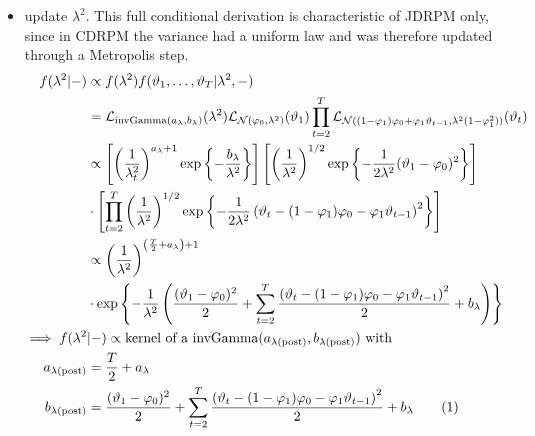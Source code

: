 \documentclass[12pt,	%
	a4paper,		%
	twoside,		%
	openright,		%
	titlepage,%
	]{book}
\theoremstyle{definition}
\begin{document}
\begin{itemize}
\item update $\lambda^2$. This full conditional derivation is characteristic of JDRPM only, since in CDRPM the variance had a uniform law and was therefore updated through a Metropolis step.
\begin{align*}
    f(\lambda^2|-) & \propto  f(\lambda^2) f(\theta_1,\ldots,\theta_T|\lambda^2,-)\\
    & = \law_{\invgamma(a_\lambda,b_\lambda)}(\lambda^2)\law_{\N(\phi_0,\lambda^2)}(\theta_1)\prod_{t=2}^{T} \law_{\N((1-\phi_1)\phi_0 +\phi_1\theta_{t-1},\lambda^2(1-\phi_1^2))}(\theta_t)\\
    &\propto \left[ \left( \frac{1}{\lambda_t^2}\right)^{a_\lambda+1} \expp{-\frac{b_\lambda}{\lambda^2}}\right] \left[ \left(\frac{1}{\lambda^2}\right)^{1/2} \expp{-\frac{1}{2\lambda^2}(\theta_1-\phi_0)^2}\right] \\
    &\cdot \left[ \prod_{t=2}^T \left(\frac{1}{\lambda^2}\right)^{1/2} \expp{-\frac{1}{2\lambda^2}\left( \theta_t - (1-\phi_1)\phi_0 -\phi_1\theta_{t-1}\right)^2} \right]\\
    & \propto \left( \frac{1}{\lambda^2}\right)^{\left( \frac{T}{2}+a_\lambda\right)+1}\\& \cdot\expp{-\frac{1}{\lambda^2}\left( \frac{(\theta_1-\phi_0)^2}{2}
 + \sum_{t=2}^T \frac{\left( \theta_t - (1-\phi_1)\phi_0 -\phi_1\theta_{t-1}\right)^2}{2}+b_\lambda\right)}\\
    \implies f(\lambda^2&|-)\propto \text{kernel of a $\invgamma(a_{\postp{\lambda}}, b_{\postp{\lambda}})$ with}\\
a_{\postp{\lambda}}&=\frac{T}{2}+a_\lambda\\
%
b_{\postp{\lambda}}&=  \frac{(\theta_1-\phi_0)^2}{2}
 + \sum_{t=2}^T \frac{\left( \theta_t - (1-\phi_1)\phi_0 -\phi_1\theta_{t-1}\right)^2}{2}+b_\lambda
 \tag{\stepcounter{equation}\theequation}
\end{align*}


\end{itemize}
\end{document}
